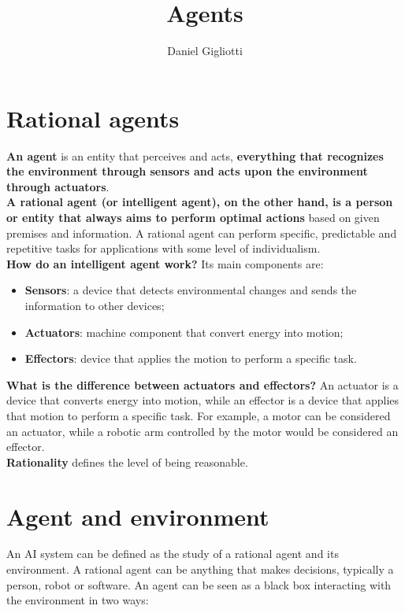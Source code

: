 \documentclass{article}
\title{Agents}
\author{Daniel Gigliotti}
\date{}
\begin{document}
\maketitle

\section{Rational agents}

\textbf{An agent} is an entity that perceives and acts, \textbf{everything that recognizes the environment through sensors and acts upon the environment through actuators}. \\


\textbf{A rational agent (or intelligent agent), on the other hand, is a person or entity that always aims to perform optimal actions} based on given premises and information. A rational agent can perform specific, predictable and repetitive tasks for applications with some level of individualism. \\


\textbf{How do an intelligent agent work?} Its main components are:
\begin{itemize}
\item \textbf{Sensors}: a device that detects environmental changes and sends the information to other devices;
\item \textbf{Actuators}: machine component that convert energy into motion;
\item \textbf{Effectors}: device that applies the motion to perform a specific task.
\end{itemize} 

\textbf{What is the difference between actuators and effectors?}
An actuator is a device that converts energy into motion, while an effector is a device that applies that motion to perform a specific task. For example, a motor can be considered an actuator, while a robotic arm controlled by the motor would be considered an effector. \\

\textbf{Rationality} defines the level of being reasonable.

\newpage

\section{Agent and environment}

An AI system can be defined as the study of a rational agent and its environment. 
A rational agent can be anything that makes decisions, typically a person, robot or software. An agent can be seen as a black box interacting with the environment in two ways:
\end{document}
